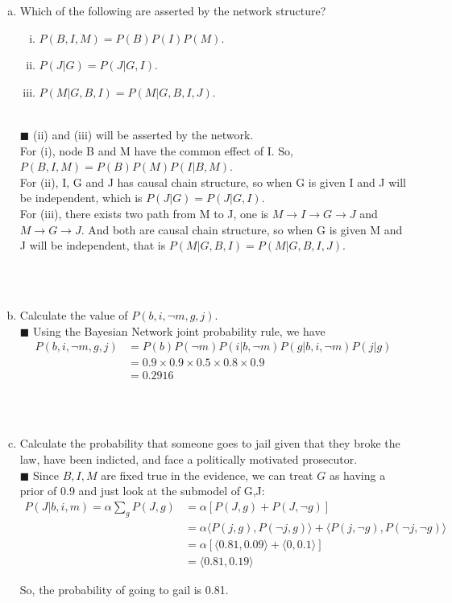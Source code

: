 \documentclass{article}
\newcommand{\solution}[1]{~\\ $\blacksquare$ \sffamily\upshape\selectfont #1
\normalfont ~\\~ }
\begin{document}
\begin{enumerate}[a.]
\item Which of the following are asserted by the network structure?
\begin{enumerate}[i.]
\item $ P(B,I,M)=P(B)P(I)P(M) $.
\item $ P(J|G)=P(J|G,I) $.
\item $ P(M|G,B,I)=P(M|G,B,I,J) $. 
\end{enumerate}
\solution{(ii) and (iii) will be asserted by the network. \\
  For (i), node B and M have the common effect of I. So, $P(B,I,M) =
  P(B)P(M)P(I|B,M)$. \\
  For (ii), I, G and J has causal chain structure, so when G is given
  I and J will be independent, which is $P(J|G)=P(J|G,I)$. \\ 
  For (iii), there exists two path from M to J, one is $M\rightarrow
  I\rightarrow G\rightarrow J$ and $M\rightarrow G\rightarrow J$. And
  both are causal chain structure, so when G is given M and J will be
  independent, that is $P(M|G,B,I)=P(M|G,B,I,J)$.
}
\item Calculate the value of $P(b, i, \neg m, g, j)$.
\solution{Using the Bayesian Network joint probability rule, we have 
\begin{align*}
  P(b, i, \neg m, g, j) & = P(b)P(\neg m)P(i|b,\neg m)P(g|b,i,\neg
  m)P(j|g) \\
  & = 0.9\times 0.9\times 0.5\times 0.8\times 0.9 \\
  & = 0.2916 
\end{align*}
}
\item Calculate the probability that someone goes to jail given that
  they broke the law, have been indicted, and face a politically
  motivated prosecutor.
\solution{
  Since $B,I,M$ are fixed true in the evidence, we can treat $G$ as
  having a prior of 0.9 and just look at the submodel of G,J:
  \begin{align*}
    P(J|b,i,m)=\alpha\sum_gP(J,g) &= \alpha[P(J,g)+P(J,\neg g)] \\
    &= \alpha\langle P(j,g),P(\neg j,g) \rangle+\langle P(j,\neg
    g),P(\neg j,\neg g) \rangle \\
    & = \alpha[\langle 0.81,0.09 \rangle + \langle 0,0.1\rangle] \\
    & = \langle 0.81,0.19 \rangle
  \end{align*}

  So, the probability of going to gail is 0.81.  \\

}
\end{enumerate}
\end{document}
